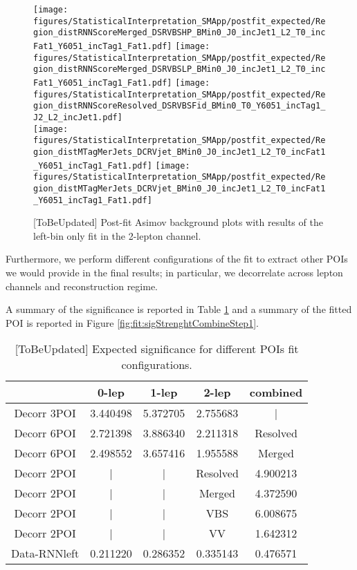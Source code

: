 \begin{figure}[h]
  \centering
  \texttt{[image: figures/StatisticalInterpretation\_SMApp/postfit\_expected/Region\_distRNNScoreMerged\_DSRVBSHP\_BMin0\_J0\_incJet1\_L2\_T0\_incFat1\_Y6051\_incTag1\_Fat1.pdf]}
  \texttt{[image: figures/StatisticalInterpretation\_SMApp/postfit\_expected/Region\_distRNNScoreMerged\_DSRVBSLP\_BMin0\_J0\_incJet1\_L2\_T0\_incFat1\_Y6051\_incTag1\_Fat1.pdf]}
  \texttt{[image: figures/StatisticalInterpretation\_SMApp/postfit\_expected/Region\_distRNNScoreResolved\_DSRVBSFid\_BMin0\_T0\_Y6051\_incTag1\_J2\_L2\_incJet1.pdf]}
  \\
  \texttt{[image: figures/StatisticalInterpretation\_SMApp/postfit\_expected/Region\_distMTagMerJets\_DCRVjet\_BMin0\_J0\_incJet1\_L2\_T0\_incFat1\_Y6051\_incTag1\_Fat1.pdf]}
  \texttt{[image: figures/StatisticalInterpretation\_SMApp/postfit\_expected/Region\_distMTagMerJets\_DCRVjet\_BMin0\_J0\_incJet1\_L2\_T0\_incFat1\_Y6051\_incTag1\_Fat1.pdf]}
  \caption{[ToBeUpdated] Post-fit Asimov background plots with results of the left-bin only fit in the 2-lepton channel.
  }
  \label{fig:expectedpostfit2lep}
\end{figure}








Furthermore, we perform different configurations of the fit to extract other POIs 
we would provide in the final results; in particular, we decorrelate across lepton channels and reconstruction regime.

A summary of the significance is reported in Table \ref{tab:significance2} 
and a summary of the fitted POI is reported in Figure \ref{fig:fit:sigStrenghtCombineStep1}.


\begin{table}[h]
  \centering
  \begin{tabular}{|c|c|c|c|c|}
    \hline
     & 0-lep & 1-lep & 2-lep & combined \\
    \hline
    Decorr 3POI & 3.440498 & 5.372705 & 2.755683 & | \\
    \hline
    Decorr 6POI & 2.721398 & 3.886340 & 2.211318 & Resolved \\
    Decorr 6POI & 2.498552 & 3.657416 & 1.955588 & Merged \\
    \hline
    Decorr 2POI & | & | & Resolved & 4.900213 \\
    Decorr 2POI & | & | & Merged   & 4.372590 \\
    \hline
    Decorr 2POI & | & | & VBS & 6.008675 \\
    Decorr 2POI & | & | & VV  & 1.642312 \\
    \hline
    Data-RNNleft & 0.211220 & 0.286352 & 0.335143 & 0.476571 \\
    \hline
    
  \end{tabular}
  \caption{[ToBeUpdated] Expected significance for different POIs fit configurations.}
  \label{tab:significance2}
\end{table}


